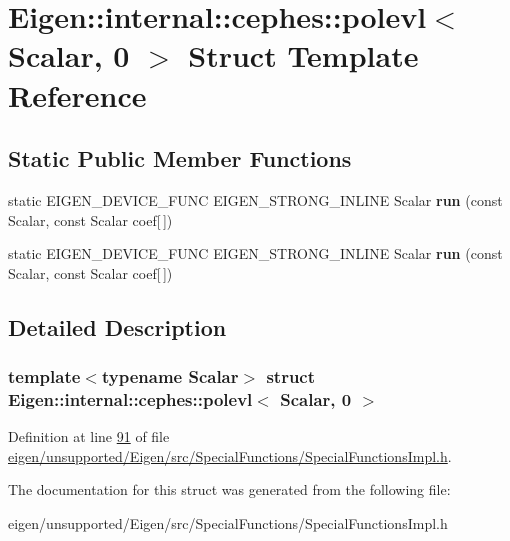 \hypertarget{struct_eigen_1_1internal_1_1cephes_1_1polevl_3_01_scalar_00_010_01_4}{}\section{Eigen\+:\+:internal\+:\+:cephes\+:\+:polevl$<$ Scalar, 0 $>$ Struct Template Reference}
\label{struct_eigen_1_1internal_1_1cephes_1_1polevl_3_01_scalar_00_010_01_4}
\subsection*{Static Public Member Functions}
\begin{DoxyCompactItemize}
\item 
\mbox{\label{struct_eigen_1_1internal_1_1cephes_1_1polevl_3_01_scalar_00_010_01_4_a31cd9e0cc70490bfc151e46f8e4c81ba}} 
static E\+I\+G\+E\+N\+\_\+\+D\+E\+V\+I\+C\+E\+\_\+\+F\+U\+NC E\+I\+G\+E\+N\+\_\+\+S\+T\+R\+O\+N\+G\+\_\+\+I\+N\+L\+I\+NE Scalar {\bfseries run} (const Scalar, const Scalar coef\mbox{[}$\,$\mbox{]})
\item 
\mbox{\label{struct_eigen_1_1internal_1_1cephes_1_1polevl_3_01_scalar_00_010_01_4_a31cd9e0cc70490bfc151e46f8e4c81ba}} 
static E\+I\+G\+E\+N\+\_\+\+D\+E\+V\+I\+C\+E\+\_\+\+F\+U\+NC E\+I\+G\+E\+N\+\_\+\+S\+T\+R\+O\+N\+G\+\_\+\+I\+N\+L\+I\+NE Scalar {\bfseries run} (const Scalar, const Scalar coef\mbox{[}$\,$\mbox{]})
\end{DoxyCompactItemize}


\subsection{Detailed Description}
\subsubsection*{template$<$typename Scalar$>$\newline
struct Eigen\+::internal\+::cephes\+::polevl$<$ Scalar, 0 $>$}



Definition at line \hyperlink{eigen_2unsupported_2_eigen_2src_2_special_functions_2_special_functions_impl_8h_source_l00091}{91} of file \hyperlink{eigen_2unsupported_2_eigen_2src_2_special_functions_2_special_functions_impl_8h_source}{eigen/unsupported/\+Eigen/src/\+Special\+Functions/\+Special\+Functions\+Impl.\+h}.



The documentation for this struct was generated from the following file\+:\begin{DoxyCompactItemize}
\item 
eigen/unsupported/\+Eigen/src/\+Special\+Functions/\+Special\+Functions\+Impl.\+h\end{DoxyCompactItemize}
